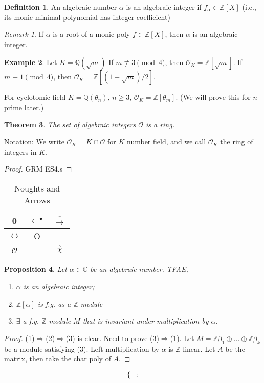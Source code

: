 \documentclass{article}
\theoremstyle{definition}
\newtheorem{defn}{Definition}[section]
\newtheorem{example}[defn]{Example}
\theoremstyle{remark}
\newtheorem{rem}{Remark}
\theoremstyle{plain}
\newtheorem{thm}[defn]{Theorem}
\newtheorem{prop}[defn]{Proposition}
\newcommand{\ZZ}{\mathbb{Z}}
\newcommand{\QQ}{\mathbb{Q}}
\newcommand{\CC}{\mathbb{C}}
\begin{document}
\begin{defn}
    An algebraic number $\alpha$ is an algebraic integer if $f_\alpha\in\ZZ[X]$ (i.e., its monic minimal polynomial has integer coefficient)
\end{defn}
\begin{rem}
    If $\alpha$ is a root of a monic poly $f\in\ZZ[X]$, then $\alpha$ is an algebraic integer.
\end{rem}
\begin{example}
    Let $K=\QQ(\sqrt m)$
    If $m\not\equiv 3\pmod 4$, then $\mathcal O_K=\ZZ[\sqrt m]$. If $m\equiv 1\pmod 4$, then $\mathcal O_K=\ZZ[(1+\sqrt m)/2]$.

    For cyclotomic field $K=\QQ(\theta_n)$, $n\ge 3$, $\mathcal O_K=\ZZ[\theta_m]$. (We will prove this for $n$ prime later.)
\end{example}
\begin{thm}
    The set of algebraic integers $\mathcal{O}$ is a ring.
\end{thm}
Notation: We write $\mathcal{O}_K=K\cap\mathcal O$ for $K$ number field, and we call $\mathcal O_K$ the ring of integers in $K$.
\begin{proof}
    GRM ES4.s
\end{proof}
\begin{table}[H]
    \centering
    \begin{tabular}{c|c|c}
         0&$\longleftarrow^\bullet$ & $\overline\longrightarrow$ \\
         \hline
         $\leftrightarrow$&O &\\
         \hline
        \(\tilde{\mathcal{O}}\) & &\(\overset{\circ}{\chi}\)
    \end{tabular}
    \caption{Noughts and Arrows}
    \label{tab:my_label}
\end{table}

\begin{prop}
    Let $\alpha\in\CC$ be an algebraic number. TFAE,
    \begin{enumerate}
        \item[(i)] $\alpha$ is an algebraic integer;
        \item[(ii)] $\ZZ[\alpha]$ is f.g. as a $\ZZ$-module
        \item[(iii)] $\exists$ a f.g. $\ZZ$-module $M$ that is invariant under multiplication by $\alpha$.
    \end{enumerate}
\end{prop}
\begin{proof}
    (1)$\Rightarrow$(2)$\Rightarrow$(3) is clear. Need to prove (3)$\Rightarrow$(1). Let $M=\ZZ\beta_1\oplus...\oplus \ZZ\beta_k$ be a module satisfying (3). Left multiplication by $\alpha$ is $\ZZ$-linear. Let $A$ be the matrix, then take the char poly of $A$.
\end{proof}
\[\{-:\tag{Owen's Signature}\]
\end{document}
